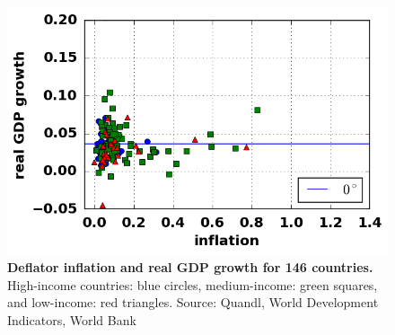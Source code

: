 \begin{figure}[h]
\caption{\label{fig_moneyGDPOpen} \textbf{Deflator inflation and real GDP growth for 146 countries.} High-income countries: blue circles, medium-income: green squares, and low-income: red triangles. {\tiny Source: Quandl, World Development Indicators, World Bank}}
\hspace*{-.5cm}\includegraphics[height = 7.cm]{fig_inflationGDPOpen.png}
\end{figure}